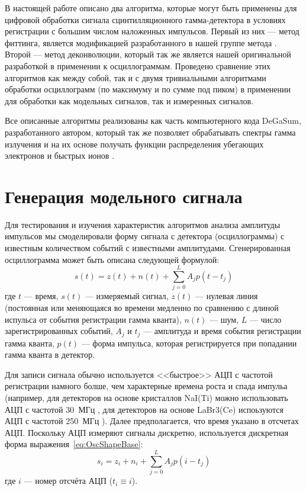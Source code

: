 В настоящей работе описано два алгоритма, которые могут быть применены для цифровой обработки сигнала сцинтилляционного гамма-детектора в условиях регистрации с большим числом наложенных импульсов. Первый из них --- метод фиттинга, является модификацией разработанного в нашей группе метода \cite{Gin2008}. Второй --- метод деконволюции, который так же является нашей оригинальной разработкой в применении к осциллограммам. Проведено сравнение этих алгоритмов как между собой, так и с двумя тривиальными алгоритмами обработки осциллограмм (по максимуму и по сумме под пиком) в применении для обработки как модельных сигналов, так и измеренных сигналов.

Все описанные алгоритмы реализованы как часть компьютерного кода DeGaSum, разработанного автором, который так же позволяет обрабатывать спектры гамма излучения и на их основе получать функции распределения убегающих электронов и быстрых ионов \cite{Khilkevitch2020}.


\section{Генерация модельного сигнала}
\label{sec:SignalGeneration}

Для тестирования и изучения характеристик алгоритмов анализа амплитуды импульсов мы смоделировали форму сигнала с детектора (осциллограммы) с известным количеством событий с известными амплитудами. Сгенерированная осциллограмма может быть описана следующей формулой:
\begin{equation}
  \label{eq:OscShapeBase}
  s(t) = z(t) + n(t) + \sum\limits_{j = 0}^{L} A_j p(t-t_j)
\end{equation}
где $t$ --- время, $s(t)$ --- измеряемый сигнал, $z(t)$ --- нулевая линия (постоянная или меняющаяся во времени медленно по сравнению с длиной испульса от события регистрации гамма кванта), $n(t)$ --- шум, $L$ --- число зарегистрированных событий, $A_j$ и $t_j$ --- амплитуда и время события регистрации гамма кванта, $p(t)$ --- форма импульса, которая регистрируется при попадании гамма кванта в детектор. 

Для записи сигнала обычно используется <<быстрое>> АЦП с частотой регистрации намного болше, чем характерные времена роста и спада импульа (например, для детекторов на основе кристаллов NaI(Ti) можно использовать АЦП с частотой 30~МГц \cite{Shevelev2004}, для детекторов на основе LaBr3(Ce) испоьзуются АЦП с частотой 250~МГц \cite{Shevelev2014,Shevelev2018,Khilkevitch2020}). Далее предполагается, что время указано в отсчетах АЦП. Поскольку АЦП измеряют сигналы дискретно, используется дискретная форма выражения~\ref{eq:OscShapeBase}:
\begin{equation*}
  s_i = z_i + n_i + \sum\limits_{j = 0}^{L} A_j p(i-t_j)
\end{equation*}
где $i$ --- номер отсчёта АЦП ($ t_i \equiv i $).

